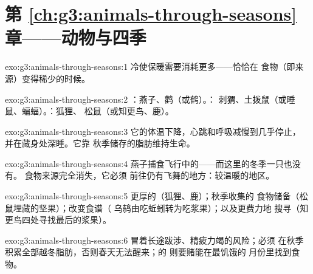 \section*{第 \ref{ch:g3:animals-through-seasons} 章——动物与四季}

\begin{solution}{exo:g3:animals-through-seasons:1}
冷使保暖需要消耗更多——恰恰在
食物（即来源）变得稀少的时候。
\end{solution}

\begin{solution}{exo:g3:animals-through-seasons:2}
：燕子、鹳（或鹤）。：
刺猬、土拨鼠（或睡鼠、蝙蝠）。：狐狸、
松鼠（或知更鸟、鹿）。
\end{solution}

\begin{solution}{exo:g3:animals-through-seasons:3}
它的体温下降，心跳和呼吸减慢到几乎停止，
并在藏身处深睡。它靠
秋季储存的脂肪维持生命。
\end{solution}

\begin{solution}{exo:g3:animals-through-seasons:4}
燕子捕食飞行中的——而这里的冬季一只也没有。
食物来源完全消失，它必须
前往仍有飞舞的地方：较温暖的地区。
\end{solution}

\begin{solution}{exo:g3:animals-through-seasons:5}
更厚的（狐狸、鹿）；秋季收集的
食物储备（松鼠埋藏的坚果）；改变食谱（
乌鸫由吃蚯蚓转为吃浆果）；以及更费力地
搜寻（知更鸟四处寻找最后的浆果）。
\end{solution}

\begin{solution}{exo:g3:animals-through-seasons:6}
冒着长途跋涉、精疲力竭的风险；必须
在秋季积累全部越冬脂肪，否则春天无法醒来；的
则要赌能在最饥饿的
月份里找到食物。
\end{solution}

